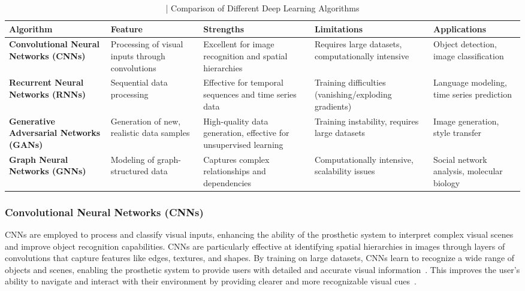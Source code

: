 \documentclass[twocolumn,10pt]{article}
\begin{document}

\begin{table}[ht!]
      \centering
      \fontsize{8pt}{10pt}\selectfont
      \caption{| Comparison of Different Deep Learning Algorithms}\label{tab:dl_algorithms_comparison}
      \begin{tabularx}{\textwidth}{X X X X X}
            \hline
            \textbf{Algorithm}                              & \textbf{Feature}                                 & \textbf{Strengths}                                                & \textbf{Limitations}                                  & \textbf{Applications}                      \\ \hline
            \textbf{Convolutional Neural Networks (CNNs)}   & Processing of visual inputs through convolutions & Excellent for image recognition and spatial hierarchies           & Requires large datasets, computationally intensive    & Object detection, image classification     \\ \hline
            \textbf{Recurrent Neural Networks (RNNs)}       & Sequential data processing                       & Effective for temporal sequences and time series data             & Training difficulties (vanishing/exploding gradients) & Language modeling, time series prediction  \\ \hline
            \textbf{Generative Adversarial Networks (GANs)} & Generation of new, realistic data samples        & High-quality data generation, effective for unsupervised learning & Training instability, requires large datasets         & Image generation, style transfer           \\ \hline
            \textbf{Graph Neural Networks (GNNs)}           & Modeling of graph-structured data                & Captures complex relationships and dependencies                   & Computationally intensive, scalability issues         & Social network analysis, molecular biology \\ \hline
      \end{tabularx}
\end{table}

\subsubsection*{Convolutional Neural Networks (CNNs)}
CNNs are employed to process and classify visual inputs, enhancing the ability
of the prosthetic system to interpret complex visual scenes and improve object
recognition capabilities. CNNs are particularly effective at identifying spatial
hierarchies in images through layers of convolutions that capture features like
edges, textures, and shapes. By training on large datasets, CNNs learn to
recognize a wide range of objects and scenes, enabling the prosthetic system to
provide users with detailed and accurate visual
information~\parencite{petrosyanDecodingInterpretingCortical2021a}. This improves the
user's ability to navigate and interact with their environment by providing
clearer and more recognizable visual
cues~\parencite{maheswaranathanInterpretingRetinalNeural2023}.
\end{document}
